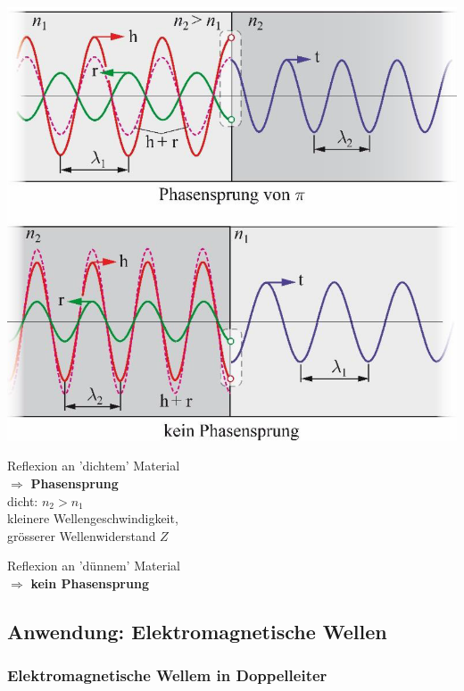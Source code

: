 \begin{minipage}{0.4\linewidth}
	\includegraphics[width=0.9\linewidth]{Bilder/Wellen-Optik/reflexion_phasensprung} \\
\end{minipage}
\hfill
\begin{minipage}{0.58\linewidth}
	Reflexion an 'dichtem' Material \\
	$\Rightarrow$ \textbf{Phasensprung} \\

	dicht: $n_2 > n_1$ \\
	kleinere Wellengeschwindigkeit,\\
	grösserer Wellenwiderstand $Z$\\
	\vspace{0.2cm}

	Reflexion an 'dünnem' Material\\
	$\Rightarrow$ \textbf{kein Phasensprung} \\

\end{minipage}




\subsection{Anwendung: Elektromagnetische Wellen}

\subsubsection{Elektromagnetische Wellem in Doppelleiter}

